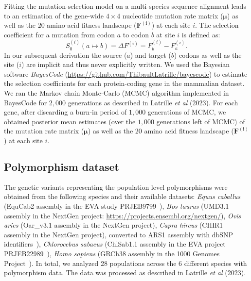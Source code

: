 \documentclass[12pt]{article}
\newcommand{\UniDimArray}[1]{\bm{#1}}
\newcommand{\Sphy}{S_{0}}
\begin{document}
    Fitting the mutation-selection model on a multi-species sequence alignment leads to an estimation of the gene-wide $4 \times 4$ nucleotide mutation rate matrix ($\UniDimArray{\mu}$) as well as the $20$ amino-acid fitness landscape ($\UniDimArray{F^{(i)}}$) at each site $i$.
    The selection coefficient for a mutation from codon $a$ to codon $b$ at site $i$ is defined as:
    \begin{equation}
        \Sphy^{(i)} (a \mapsto b) = \Delta F^{(i)} = F^{(i)}_{b} - F^{(i)}_{a}.
    \end{equation}
    In our subsequent derivation the source ($a$) and target ($b$) codons as well as the site ($i$) are implicit and thus never explicitly written.
    We used the Bayesian software \textit{BayesCode} (\url{https://github.com/ThibaultLatrille/bayescode}) to estimate the selection coefficients for each protein-coding gene in the mammalian dataset.
    We ran the Markov chain Monte-Carlo (MCMC) algorithm implemented in BayesCode for $2,000$ generations as described in Latrille \textit{et al} (2023)\cite{latrille_genes_2023}.
    For each gene, after discarding a burn-in period of $1,000$ generations of MCMC, we obtained posterior mean estimates (over the $1,000$ generations left of MCMC) of the mutation rate matrix ($\UniDimArray{\mu}$) as well as the $20$ amino acid fitness landscape ($\UniDimArray{F^{(i)}}$) at each site $i$.

    \subsection{Polymorphism dataset}
    \label{subsec:polymorphism-dataset}

    The genetic variants representing the population level polymorphisms were obtained from the following species and their available datasets: \textit{Equus caballus} (EquCab2 assembly in the EVA study PRJEB9799~\cite{alabri_whole_2020}), \textit{Bos taurus} (UMD3.1 assembly in the NextGen project: \url{https://projects.ensembl.org/nextgen/}), \textit{Ovis aries} (Oar\_v3.1 assembly in the NextGen project), \textit{Capra hircus} (CHIR1 assembly in the NextGen project), converted to ARS1 assembly with dbSNP identifiers~\cite{sherry_dbsnp_2001}), \textit{Chlorocebus sabaeus} (ChlSab1.1 assembly in the EVA project PRJEB22989~\cite{svardal_ancient_2017}), \textit{Homo sapiens} (GRCh38 assembly in the 1000 Genomes Project~\cite{zheng-bradley_alignment_2017}).
    In total, we analyzed 28 populations across the 6 different species with polymorphism data.
    The data was processed as described in Latrille \textit{et al} (2023)\cite{latrille_genes_2023}.
\end{document}
